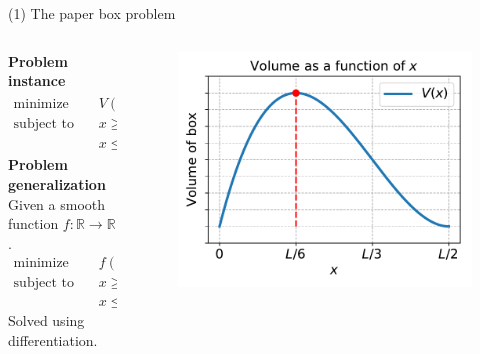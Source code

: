 \documentclass[11pt, aspectratio=149]{beamer}
\theoremstyle{plain}
\begin{document}
\begin{frame}[fragile, t]{(1) The paper box problem}
\begin{columns}
\begin{column}{0.55\textwidth}
\textbf{Problem instance}
\begin{align*}
\text{minimize } \quad & V(x) = (L - 2x)^2 x  \\
\text{subject to } \quad & x \geq 0 \\
& x \leq L/2
\end{align*}
\textbf{Problem generalization}
\\
\vspace*{0.5em} 
Given a smooth function $f: \mathbb{R} \to \mathbb{R}$.
\begin{align*}
	\text{minimize } \quad & f(x) \\
	\text{subject to } \quad & x \geq a \\
	 & x \leq b
\end{align*}
Solved using differentiation.
\end{column}
\begin{column}{0.45\textwidth}%
	\begin{figure}
		\centering
		\includegraphics[width=1.05\linewidth]{figs/paper_box_volume.pdf}
	\end{figure}
\end{column}
\end{columns}
\end{frame}

\end{document}
